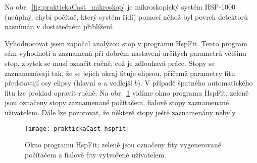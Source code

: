 Na obr.~\ref{fig:praktickaCast_mikroskop} je mikroskopický systém HSP-1000 (neúplný, chybí počítač, který systém řídí) pomocí něhož byl povrch detektorů nasnímán v dostatečném přiblížení.

Vyhodnocovat jsem započal analýzou stop v programu HspFit. Tento program sám vyhodnotí a zaznamená při dobrém nastavení určitých parametrů většinu stop, zbytek se musí označit ručně, což je zdlouhavá práce. Stopy se zaznamenávají tak, že se jejich okraj fituje elipsou, přičemž parametry fitu představují osy elipsy (hlavní $a$ a vedlejší $b$). V případě špatného automatického fitu lze proklad opravit ručně. Na obr.~\ref{fig:praktickaCast_hspfit} vidíme okno programu HspFit, zeleně jsou označeny stopy zaznamenané počítačem, fialově stopy zaznamenané uživatelem. Dále lze pozorovat, že některé stopy ještě zaznamenány nebyly. 
\begin{figure}[ht]
  \centering
  \texttt{[image: praktickaCast\_hspfit]}
  \caption{Okno programu HspFit; zeleně jsou označeny fity vygenerované počítačem a fialově fity vytvořené uživatelem.~\cite{dosis_HSP1000}}
  \label{fig:praktickaCast_hspfit}
\end{figure}

